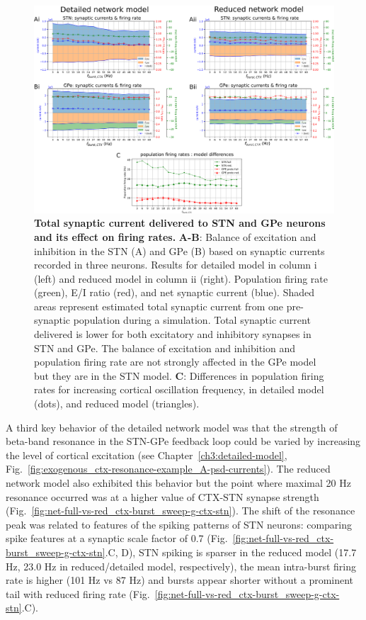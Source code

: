 \begin{figure}[ht]
\centering
\includegraphics[width=\textwidth]{ch_reduced_model/figs/fig_net-full-vs-red_sweep-f-burst-ctx_currents-EI.png}
\caption{
\textbf{Total synaptic current delivered to STN and GPe neurons and its effect on firing rates.}
\textbf{A-B}: Balance of excitation and inhibition in the STN (A) and GPe (B) based on synaptic currents recorded in three neurons. Results for detailed model in column i (left) and reduced model in column ii (right).
Population firing rate (green), E/I ratio (red), and net synaptic current (blue). Shaded areas represent estimated total synaptic current from one pre-synaptic population during a simulation. Total synaptic current delivered
is lower for both excitatory and inhibitory synapses in STN and GPe. The balance of excitation and inhibition
and population firing rate are not strongly affected in the GPe model but they are in the STN model.
\textbf{C}: Differences in population firing rates for increasing cortical oscillation frequency, in detailed model (dots), and reduced model (triangles).
}
\label{fig:net-full-vs-red_sweep-f-burst_currents-EI}
\end{figure}

%
%

A third key behavior of the detailed network model was that the strength of
beta-band resonance in the STN-GPe feedback loop could be varied by increasing
the level of cortical excitation (see Chapter~\ref{ch3:detailed-model}, Fig.~\ref{fig:exogenous_ctx-resonance-example_A-psd-currents}).
%
The reduced network model also exhibited this behavior but the point where
maximal 20 Hz resonance occurred was at a higher value of CTX-STN synapse strength
(Fig.~\ref{fig:net-full-vs-red_ctx-burst_sweep-g-ctx-stn}).
The shift of the resonance peak was related to features of the spiking patterns of STN neurons:
comparing spike features at a synaptic scale factor of 0.7 (Fig.~\ref{fig:net-full-vs-red_ctx-burst_sweep-g-ctx-stn}.C, D),
STN spiking is sparser in the reduced model (17.7 Hz, 23.0 Hz in reduced/detailed model,
respectively), the mean intra-burst firing rate is higher (101 Hz vs 87 Hz)
and bursts appear shorter without a prominent tail with reduced firing rate
(Fig.~\ref{fig:net-full-vs-red_ctx-burst_sweep-g-ctx-stn}.C).
%

